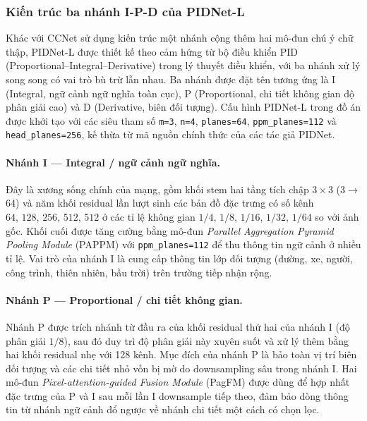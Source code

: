 \subsubsection{Kiến trúc ba nhánh I-P-D của PIDNet-L}
\label{subsec:pidnet-3-branch}

Khác với CCNet sử dụng kiến trúc một nhánh cộng thêm hai mô-đun chú ý chữ thập, PIDNet-L được thiết kế theo cảm hứng từ bộ điều khiển PID (Proportional--Integral--Derivative) trong lý thuyết điều khiển, với ba nhánh xử lý song song có vai trò bù trừ lẫn nhau. Ba nhánh được đặt tên tương ứng là I (Integral, ngữ cảnh ngữ nghĩa toàn cục), P (Proportional, chi tiết không gian độ phân giải cao) và D (Derivative, biên đối tượng). Cấu hình PIDNet-L trong đồ án được khởi tạo với các siêu tham số \texttt{m=3}, \texttt{n=4}, \texttt{planes=64}, \texttt{ppm\_planes=112} và \texttt{head\_planes=256}, kế thừa từ mã nguồn chính thức của các tác giả PIDNet.

\paragraph{Nhánh I --- Integral / ngữ cảnh ngữ nghĩa.} Đây là xương sống chính của mạng, gồm khối stem hai tầng tích chập $3\times3$ (3$\to$64) và năm khối residual lần lượt sinh các bản đồ đặc trưng có số kênh $64,\,128,\,256,\,512,\,512$ ở các tỉ lệ không gian $1/4,\,1/8,\,1/16,\,1/32,\,1/64$ so với ảnh gốc. Khối cuối được tăng cường bằng mô-đun \textit{Parallel Aggregation Pyramid Pooling Module} (PAPPM) với \texttt{ppm\_planes=112} để thu thông tin ngữ cảnh ở nhiều tỉ lệ. Vai trò của nhánh I là cung cấp thông tin lớp đối tượng (đường, xe, người, công trình, thiên nhiên, bầu trời) trên trường tiếp nhận rộng.

\paragraph{Nhánh P --- Proportional / chi tiết không gian.} Nhánh P được trích nhánh từ đầu ra của khối residual thứ hai của nhánh I (độ phân giải $1/8$), sau đó duy trì độ phân giải này xuyên suốt và xử lý thêm bằng hai khối residual nhẹ với 128 kênh. Mục đích của nhánh P là bảo toàn vị trí biên đối tượng và các chi tiết nhỏ vốn bị mờ do downsampling sâu trong nhánh I. Hai mô-đun \textit{Pixel-attention-guided Fusion Module} (PagFM) được dùng để hợp nhất đặc trưng của P và I sau mỗi lần I downsample tiếp theo, đảm bảo dòng thông tin từ nhánh ngữ cảnh đổ ngược về nhánh chi tiết một cách có chọn lọc.

